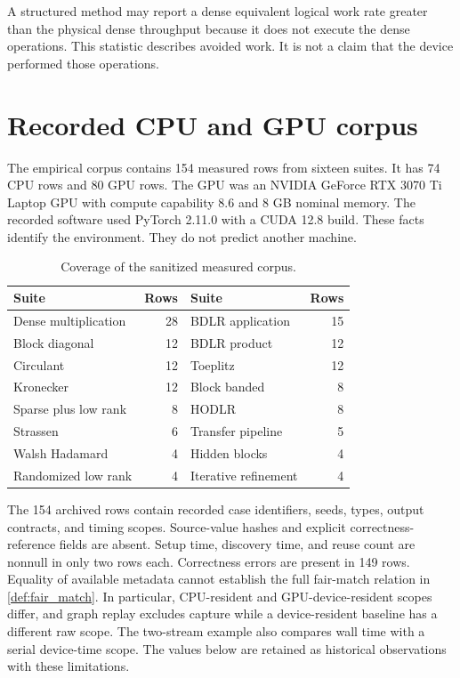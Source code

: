 \begin{remark}\label{main:remark:005}\label{rem:logical_gflops}
A structured method may report a dense equivalent logical work rate greater than the physical dense throughput because it does not execute the dense operations. This statistic describes avoided work. It is not a claim that the device performed those operations.
\end{remark}

\section{Recorded CPU and GPU corpus}\label{main:section:012}\label{sec:measured}

The empirical corpus contains 154 measured rows from sixteen suites. It has 74 CPU rows and 80 GPU rows. The GPU was an NVIDIA GeForce RTX 3070 Ti Laptop GPU with compute capability 8.6 and 8 GB nominal memory. The recorded software used PyTorch 2.11.0 with a CUDA 12.8 build. These facts identify the environment. They do not predict another machine.

\begin{table}[t]
\centering
\small
\begin{tabular}{>{\raggedright\arraybackslash}p{}r>{\raggedright\arraybackslash}p{}r}
\toprule
Suite & Rows & Suite & Rows \\
\midrule
Dense multiplication & 28 & BDLR application & 15 \\
Block diagonal & 12 & BDLR product & 12 \\
Circulant & 12 & Toeplitz & 12 \\
Kronecker & 12 & Block banded & 8 \\
Sparse plus low rank & 8 & HODLR & 8 \\
Strassen & 6 & Transfer pipeline & 5 \\
Walsh Hadamard & 4 & Hidden blocks & 4 \\
Randomized low rank & 4 & Iterative refinement & 4 \\
\bottomrule
\end{tabular}
\caption{Coverage of the sanitized measured corpus.}
\label{tab:suites}
\end{table}

The 154 archived rows contain recorded case identifiers, seeds, types, output contracts, and timing scopes. Source-value hashes and explicit correctness-reference fields are absent. Setup time, discovery time, and reuse count are nonnull in only two rows each. Correctness errors are present in 149 rows. Equality of available metadata cannot establish the full fair-match relation in \cref{def:fair_match}. In particular, CPU-resident and GPU-device-resident scopes differ, and graph replay excludes capture while a device-resident baseline has a different raw scope. The two-stream example also compares wall time with a serial device-time scope. The values below are retained as historical observations with these limitations.

